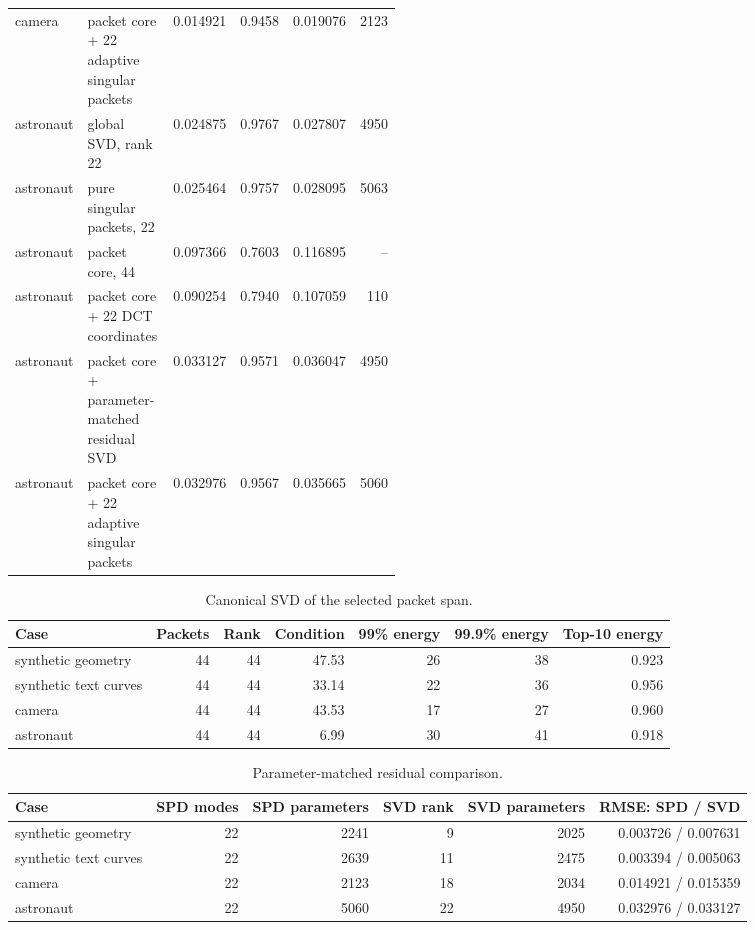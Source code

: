 \begin{longtable}{@{}L{0.16\linewidth}L{0.29\linewidth}rrrr@{}}
camera & packet core + 22 adaptive singular packets & 0.014921 & 0.9458 & 0.019076 & 2123\\
astronaut & global SVD, rank 22 & 0.024875 & 0.9767 & 0.027807 & 4950\\
astronaut & pure singular packets, 22 & 0.025464 & 0.9757 & 0.028095 & 5063\\
astronaut & packet core, 44 & 0.097366 & 0.7603 & 0.116895 & --\\
astronaut & packet core + 22 DCT coordinates & 0.090254 & 0.7940 & 0.107059 & 110\\
astronaut & packet core + parameter-matched residual SVD & 0.033127 & 0.9571 & 0.036047 & 4950\\
astronaut & packet core + 22 adaptive singular packets & 0.032976 & 0.9567 & 0.035665 & 5060\\
\bottomrule\end{longtable}

\begin{table}[H]\centering
\caption{Canonical SVD of the selected packet span.}\label{tab:packet-span-svd}
\small\begin{tabular}{lrrrrrr}\toprule Case & Packets & Rank & Condition & 99\% energy & 99.9\% energy & Top-10 energy\\\midrule
synthetic geometry & 44 & 44 & 47.53 & 26 & 38 & 0.923\\
synthetic text curves & 44 & 44 & 33.14 & 22 & 36 & 0.956\\
camera & 44 & 44 & 43.53 & 17 & 27 & 0.960\\
astronaut & 44 & 44 & 6.99 & 30 & 41 & 0.918\\
\bottomrule\end{tabular}\end{table}

\begin{table}[H]\centering
\caption{Parameter-matched residual comparison.}\label{tab:param-matched}
\small\begin{tabular}{lrrrrr}\toprule Case & SPD modes & SPD parameters & SVD rank & SVD parameters & RMSE: SPD / SVD\\\midrule
synthetic geometry & 22 & 2241 & 9 & 2025 & 0.003726 / 0.007631\\
synthetic text curves & 22 & 2639 & 11 & 2475 & 0.003394 / 0.005063\\
camera & 22 & 2123 & 18 & 2034 & 0.014921 / 0.015359\\
astronaut & 22 & 5060 & 22 & 4950 & 0.032976 / 0.033127\\
\bottomrule\end{tabular}\end{table}
